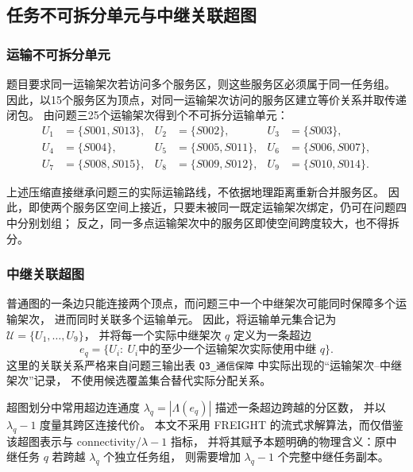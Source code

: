 \subsection{任务不可拆分单元与中继关联超图}

\subsubsection{运输不可拆分单元}

题目要求同一运输架次若访问多个服务区，则这些服务区必须属于同一任务组。
因此，以15个服务区为顶点，对同一运输架次访问的服务区建立等价关系并取传递闭包。
由问题三25个运输架次得到\QFourUnitNum 个不可拆分运输单元：
\begin{equation}
\begin{aligned}
U_1&=\{S001,S013\}, & U_2&=\{S002\}, & U_3&=\{S003\},\\
U_4&=\{S004\}, & U_5&=\{S005,S011\}, & U_6&=\{S006,S007\},\\
U_7&=\{S008,S015\}, & U_8&=\{S009,S012\}, & U_9&=\{S010,S014\}.
\end{aligned}
\label{eq:q4-units}
\end{equation}

上述压缩直接继承问题三的实际运输路线，不依据地理距离重新合并服务区。
因此，即使两个服务区空间上接近，只要未被同一既定运输架次绑定，仍可在问题四中分别划组；
反之，同一多点运输架次中的服务区即使空间跨度较大，也不得拆分。

\subsubsection{中继关联超图}

普通图的一条边只能连接两个顶点，而问题三中一个中继架次可能同时保障多个运输架次，
进而同时关联多个运输单元。
因此，将运输单元集合记为
\(
\mathcal U=\{U_1,\ldots,U_9\}
\)，
并将每一个实际中继架次 $q$ 定义为一条超边
\begin{equation}
 e_q=\{U_i:\ U_i\text{中的至少一个运输架次实际使用中继 }q\}.
 \label{eq:q4-hyperedge}
\end{equation}
这里的关联关系严格来自问题三输出表 \texttt{Q3\_通信保障} 中实际出现的“运输架次--中继架次”记录，
不使用候选覆盖集合替代实际分配关系。

超图划分中常用超边连通度
\(
\lambda_q=|\Lambda(e_q)|
\)
描述一条超边跨越的分区数，
并以 $\lambda_q-1$ 度量其跨区连接代价\cite{q4-eyubov2025}。
本文不采用 FREIGHT 的流式求解算法，而仅借鉴该超图表示与 connectivity/$\lambda-1$ 指标，
并将其赋予本题明确的物理含义：原中继任务 $q$ 若跨越 $\lambda_q$ 个独立任务组，
则需要增加 $\lambda_q-1$ 个完整中继任务副本。


